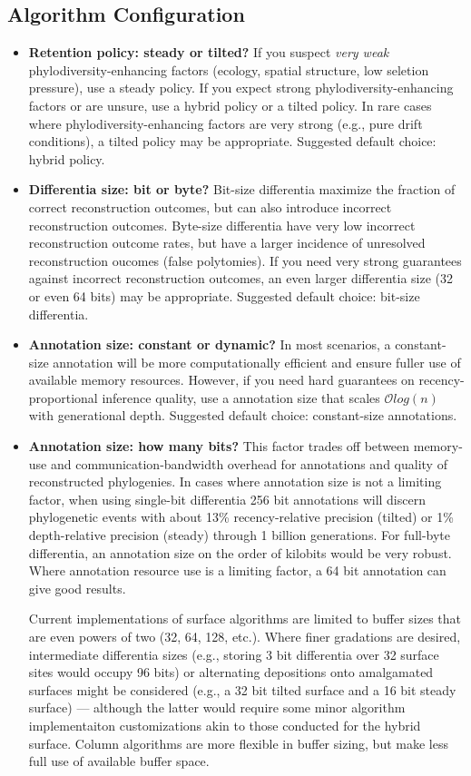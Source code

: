\begin{enumerate}
\subsection{Algorithm Configuration}
\begin{itemize}
\item \textbf{Retention policy: steady or tilted?}
  If you suspect \textit{very weak} phylodiversity-enhancing factors (ecology, spatial structure, low seletion pressure), use a steady policy.
  If you expect strong phylodiversity-enhancing factors or are unsure, use a hybrid policy or a tilted policy.
  In rare cases where phylodiversity-enhancing factors are very strong (e.g., pure drift conditions), a tilted policy may be appropriate.
  Suggested default choice: hybrid policy.
\item \textbf{Differentia size: bit or byte?}
  Bit-size differentia maximize the fraction of correct reconstruction outcomes, but can also introduce incorrect reconstruction outcomes.
  Byte-size differentia have very low incorrect reconstruction outcome rates, but have a larger incidence of unresolved reconstruction oucomes (false polytomies).
  If you need very strong guarantees against incorrect reconstruction outcomes, an even larger differentia size (32 or even 64 bits) may be appropriate.
  Suggested default choice: bit-size differentia.
\item \textbf{Annotation size: constant or dynamic?}
  In most scenarios, a constant-size annotation will be more computationally efficient and ensure fuller use of available memory resources.
  However, if you need hard guarantees on recency-proportional inference quality, use a annotation size that scales $\mathcal{O}log(n)$ with generational depth.
  Suggested default choice: constant-size annotations.
\item \textbf{Annotation size: how many bits?}
  This factor trades off between memory-use and communication-bandwidth overhead for annotations and quality of reconstructed phylogenies.
  In cases where annotation size is not a limiting factor, when using single-bit differentia 256 bit annotations will discern phylogenetic events with about 13\% recency-relative precision (tilted) or 1\% depth-relative precision (steady) through 1 billion generations.
  For full-byte differentia, an annotation size on the order of kilobits would be very robust.
  Where annotation resource use is a limiting factor, a 64 bit annotation can give good results.

  Current implementations of surface algorithms are limited to buffer sizes that are even powers of two (32, 64, 128, etc.).
  Where finer gradations are desired, intermediate differentia sizes (e.g., storing 3 bit differentia over 32 surface sites would occupy 96 bits) or alternating depositions onto amalgamated surfaces might be considered (e.g., a 32 bit tilted surface and a 16 bit steady surface) --- although the latter would require some minor algorithm implementaiton customizations akin to those conducted for the hybrid surface.
  Column algorithms are more flexible in buffer sizing, but make less full use of available buffer space.


\end{itemize}
\end{enumerate}
